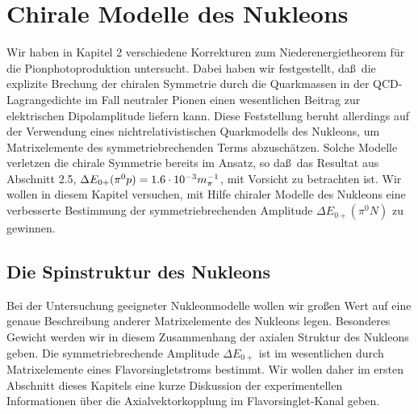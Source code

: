 \chapter{Chirale Modelle des Nukleons}
Wir haben in  Kapitel 2 verschiedene Korrekturen zum
Niederenergietheorem f\"ur die Pionphotoproduktion untersucht. 
Dabei haben wir festgestellt, da\ss\ die explizite Brechung der chiralen 
Symmetrie durch die Quarkmassen in der QCD-Lagrangedichte 
im Fall neutraler Pionen einen wesentlichen Beitrag 
zur elektrischen Dipolamplitude liefern kann.  Diese Feststellung
beruht allerdings auf der Verwendung eines nichtrelativistischen
Quarkmodells des Nukleons, um Matrixelemente des symmetriebrechenden Terms 
abzusch\"atzen. Solche Modelle verletzen die chirale Symmetrie bereits im
Ansatz, so da\ss\ das Resultat aus Abschnitt 2.5, $\Delta E_{0+}
(\pi^0p)=1.6\cdot 10^{-3} m_\pi^{-1}$, mit Vorsicht zu betrachten ist. Wir wollen in diesem 
Kapitel versuchen, mit Hilfe chiraler Modelle des Nukleons eine verbesserte 
Bestimmung der symmetriebrechenden Amplitude $\Delta E_{0+}(\pi^0N)$ 
zu gewinnen.

\section{Die Spinstruktur des Nukleons}
Bei der Untersuchung geeigneter Nukleonmodelle wollen wir gro\ss en Wert 
auf eine genaue Beschreibung anderer Matrixelemente des Nukleons legen.
Besonderes Gewicht werden wir in diesem Zusammenhang der axialen Struktur
des Nukleons geben. Die sym\-me\-trie\-brechende Amplitude 
$\Delta E_{0+}$ ist im wesentlichen durch
Matrixelemente eines Flavorsingletstroms bestimmt. Wir wollen daher im 
ersten Abschnitt dieses Kapitels eine kurze Diskussion der experimentellen 
Informationen \"uber die Axialvektorkopplung im Flavorsinglet-Kanal geben.

